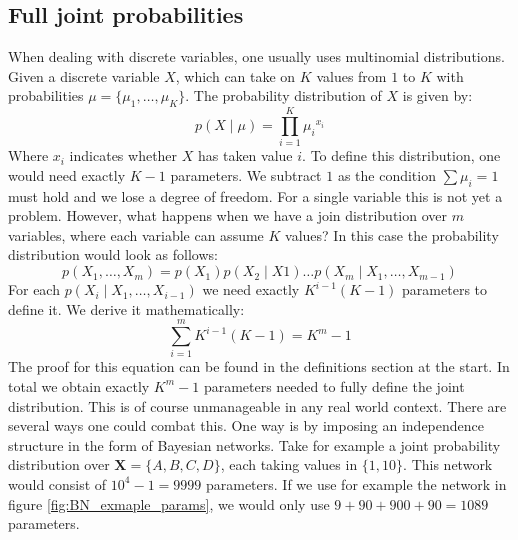 \subsection{Full joint probabilities}
When dealing with discrete variables, one usually uses multinomial 
distributions. Given a discrete variable $X$, which can take on
$K$ values from $1$ to $K$ with probabilities 
$\mu = \{\mu_1, \dots, \mu_K\}$. The probability 
distribution of $X$ is given by:
\begin{equation}
p(X \mid \mu) = \prod_{i=1}^{K} {\mu_i}^{x_i}
\end{equation}
Where $x_i$ indicates whether $X$ has taken value $i$. To define
this distribution, one would need exactly $K - 1$ parameters. We
subtract $1$ as the condition $\sum \mu_i = 1$ must hold and we
lose a degree of freedom. For a single variable this is not yet a
problem. However, what happens when we have a join distribution over
$m$ variables, where each variable can assume $K$ values?
In this case the probability distribution would look as follows:
\begin{equation}
p(X_1, \dots, X_m) = p(X_1)p(X_2 \mid X1)\dots p(X_m \mid X_1, \dots, X_{m-1})
\end{equation}
For each $p(X_i \mid X_1, \dots, X_{i-1})$ we need exactly $K^{i-1}(K - 1)$
parameters to define it. We derive it mathematically:
\begin{equation}
\sum_{i=1}^{m} K^{i-1}(K - 1) = K^m -1
\end{equation}
The proof for this equation can be found in the definitions
section at the start.
In total we obtain exactly $K^m - 1$ parameters
needed to fully define the joint distribution. This is of course
unmanageable in any real world context. There are several ways 
one could combat this. One way is by imposing an independence structure
in the form of Bayesian networks. Take for example a joint probability
distribution over $\textbf{X} = \{A, B, C, D\}$, each taking values in
$\{1, 10\}$. This network would consist of $10^{4} - 1 = 9999$ 
parameters. If we use for example the network in figure
\ref{fig:BN_exmaple_params}, we would only use $9 + 90 + 900 + 90 
= 1089$ 
parameters.
